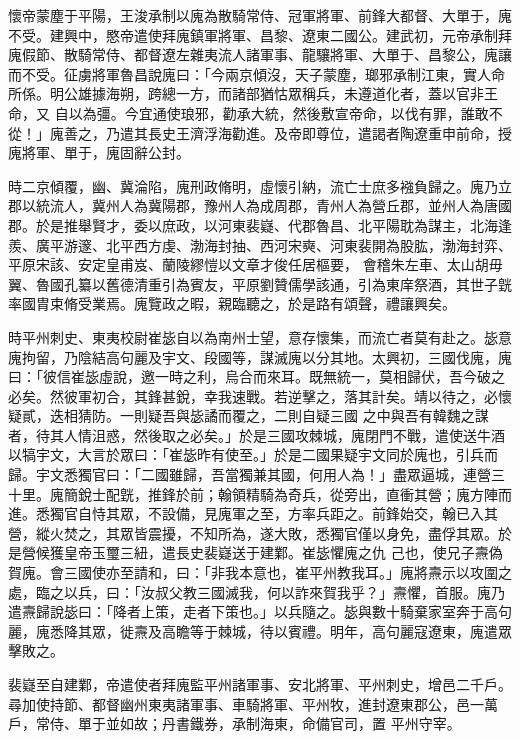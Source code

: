 \begin{pinyinscope}
 懷帝蒙塵于平陽，王浚承制以廆為散騎常侍、冠軍將軍、前鋒大都督、大單于，廆不受。建興中，愍帝遣使拜廆鎮軍將軍、昌黎、遼東二國公。建武初，元帝承制拜廆假節、散騎常侍、都督遼左雜夷流人諸軍事、龍驤將軍、大單于、昌黎公，廆讓而不受。征虜將軍魯昌說廆曰：「今兩京傾沒，天子蒙塵，瑯邪承制江東，實人命所係。明公雄據海朔，跨總一方，而諸部猶怙眾稱兵，未遵道化者，蓋以官非王命，又
 自以為彊。今宜通使琅邪，勸承大統，然後敷宣帝命，以伐有罪，誰敢不從！」廆善之，乃遣其長史王濟浮海勸進。及帝即尊位，遣謁者陶遼重申前命，授廆將軍、單于，廆固辭公封。



 時二京傾覆，幽、冀淪陷，廆刑政脩明，虛懷引納，流亡士庶多襁負歸之。廆乃立郡以統流人，冀州人為冀陽郡，豫州人為成周郡，青州人為營丘郡，並州人為唐國郡。於是推舉賢才，委以庶政，以河東裴嶷、代郡魯昌、北平陽耽為謀主，北海逢羨、廣平游邃、北平西方虔、渤海封抽、西河宋奭、河東裴開為股肱，渤海封弈、平原宋該、安定皇甫岌、蘭陵繆愷以文章才俊任居樞要，
 會稽朱左車、太山胡毋翼、魯國孔纂以舊德清重引為賓友，平原劉贊儒學該通，引為東庠祭酒，其世子皝率國胄束脩受業焉。廆覽政之暇，親臨聽之，於是路有頌聲，禮讓興矣。



 時平州刺史、東夷校尉崔毖自以為南州士望，意存懷集，而流亡者莫有赴之。毖意廆拘留，乃陰結高句麗及宇文、段國等，謀滅廆以分其地。太興初，三國伐廆，廆曰：「彼信崔毖虛說，邀一時之利，烏合而來耳。既無統一，莫相歸伏，吾今破之必矣。然彼軍初合，其鋒甚銳，幸我速戰。若逆擊之，落其計矣。靖以待之，必懷疑貳，迭相猜防。一則疑吾與毖譎而覆之，二則自疑三國
 之中與吾有韓魏之謀者，待其人情沮惑，然後取之必矣。」於是三國攻棘城，廆閉門不戰，遣使送牛酒以犒宇文，大言於眾曰：「崔毖昨有使至。」於是二國果疑宇文同於廆也，引兵而歸。宇文悉獨官曰：「二國雖歸，吾當獨兼其國，何用人為！」盡眾逼城，連營三十里。廆簡銳士配皝，推鋒於前；翰領精騎為奇兵，從旁出，直衝其營；廆方陣而進。悉獨官自恃其眾，不設備，見廆軍之至，方率兵距之。前鋒始交，翰已入其營，縱火焚之，其眾皆震擾，不知所為，遂大敗，悉獨官僅以身免，盡俘其眾。於是營候獲皇帝玉璽三紐，遣長史裴嶷送于建鄴。崔毖懼廆之仇
 己也，使兄子燾偽賀廆。會三國使亦至請和，曰：「非我本意也，崔平州教我耳。」廆將燾示以攻圍之處，臨之以兵，曰：「汝叔父教三國滅我，何以詐來賀我乎？」燾懼，首服。廆乃遣燾歸說毖曰：「降者上策，走者下策也。」以兵隨之。毖與數十騎棄家室奔于高句麗，廆悉降其眾，徙燾及高瞻等于棘城，待以賓禮。明年，高句麗寇遼東，廆遣眾擊敗之。



 裴嶷至自建鄴，帝遣使者拜廆監平州諸軍事、安北將軍、平州刺史，增邑二千戶。尋加使持節、都督幽州東夷諸軍事、車騎將軍、平州牧，進封遼東郡公，邑一萬戶，常侍、單于並如故；丹書鐵券，承制海東，命備官司，置
 平州守宰。




\end{pinyinscope}
